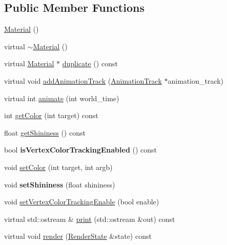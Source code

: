 \subsection*{Public Member Functions}
\begin{CompactItemize}
\item 
\hyperlink{classm3g_1_1Material_ade2019060d01e7983e9bc40ea6aa404}{Material} ()
\item 
virtual \hyperlink{classm3g_1_1Material_b15b7efa255e5cca9b02a031a783cfe8}{$\sim$Material} ()
\item 
virtual \hyperlink{classm3g_1_1Material}{Material} $\ast$ \hyperlink{classm3g_1_1Material_1bdbc2f934efac291bf7d8f49ba10dda}{duplicate} () const 
\item 
virtual void \hyperlink{classm3g_1_1Material_415c0b110f95410ded9b85e5d99a496b}{addAnimationTrack} (\hyperlink{classm3g_1_1AnimationTrack}{AnimationTrack} $\ast$animation\_\-track)
\item 
virtual int \hyperlink{classm3g_1_1Material_8aad1ceab4c2a03609c8a42324ce484d}{animate} (int world\_\-time)
\item 
int \hyperlink{classm3g_1_1Material_d5740043584c6bf87bf014402c5985be}{getColor} (int target) const 
\item 
float \hyperlink{classm3g_1_1Material_1bab082fe3510dbe7b98dd07b3976b5b}{getShininess} () const 
\item 
\hypertarget{classm3g_1_1Material_64fb5d60325fd073ab623d0eb04189d1}{
bool \textbf{isVertexColorTrackingEnabled} () const }
\label{classm3g_1_1Material_64fb5d60325fd073ab623d0eb04189d1}

\item 
void \hyperlink{classm3g_1_1Material_5947a525a18bca77aa890971df2ae48a}{setColor} (int target, int argb)
\item 
\hypertarget{classm3g_1_1Material_fb630e98bef48acb3b3c0541ed3615be}{
void \textbf{setShininess} (float shininess)}
\label{classm3g_1_1Material_fb630e98bef48acb3b3c0541ed3615be}

\item 
void \hyperlink{classm3g_1_1Material_55778ceeb6408e5db698c793dea1edd6}{setVertexColorTrackingEnable} (bool enable)
\item 
virtual std::ostream \& \hyperlink{classm3g_1_1Material_6fea17fa1532df3794f8cb39cb4f911f}{print} (std::ostream \&out) const 
\item 
virtual void \hyperlink{classm3g_1_1Material_8babc8a79b78615da51161e94029eea9}{render} (\hyperlink{structm3g_1_1RenderState}{RenderState} \&state) const 
\end{CompactItemize}
